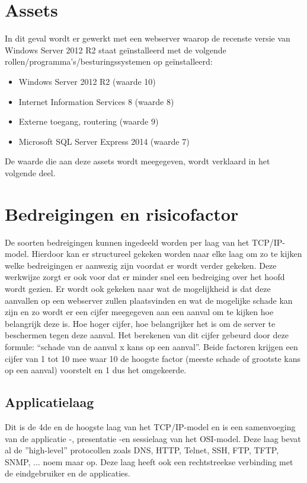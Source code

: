 \documentclass[pdftex,a4paper,12pt]{report}
\begin{document}
\section{Assets}
In dit geval wordt er gewerkt met een webserver waarop de recenste versie van Windows Server 2012 R2 staat geïnstalleerd met de volgende rollen/programma's/besturingssystemen op geïnstalleerd:
\begin{itemize}
	\item Windows Server 2012 R2 (waarde 10)
	\item Internet Information Services 8 (waarde 8)
	\item Externe toegang, routering (waarde 9)
	\item Microsoft SQL Server Express 2014 (waarde 7)
\end{itemize}
De waarde die aan deze assets wordt meegegeven, wordt verklaard in het volgende deel.

\section{Bedreigingen en risicofactor}
De soorten bedreigingen kunnen ingedeeld worden per laag van het TCP/IP-model. Hierdoor kan er structureel gekeken worden naar elke laag om zo te kijken welke bedreigingen er aanwezig zijn voordat er wordt verder gekeken. Deze werkwijze zorgt er ook voor dat er minder snel een bedreiging over het hoofd wordt gezien. Er wordt ook gekeken naar wat de mogelijkheid is dat deze aanvallen op een webserver zullen plaatsvinden en wat de mogelijke schade kan zijn en zo wordt er een cijfer meegegeven aan een aanval om te kijken hoe belangrijk deze is. Hoe hoger cijfer, hoe belangrijker het is om de server te beschermen tegen deze aanval. Het berekenen van dit cijfer gebeurd door deze formule: "`schade van de aanval x kans op een aanval"'. Beide factoren krijgen een cijfer van 1 tot 10 mee waar 10 de hoogste factor (meeste schade of grootste kans op een aanval) voorstelt en 1 dus het omgekeerde. \citep{Sim2005}

\subsection{Applicatielaag}
Dit is de 4de en de hoogste laag van het TCP/IP-model en is een samenvoeging van de applicatie -, presentatie -en sessielaag van het OSI-model. Deze laag bevat al de ''high-level'' protocollen zoals DNS, HTTP, Telnet, SSH, FTP, TFTP, SNMP, ... noem maar op. Deze laag heeft ook een rechtstreekse verbinding met de eindgebruiker en de applicaties. \citep{Thomas2013}
\end{document}
